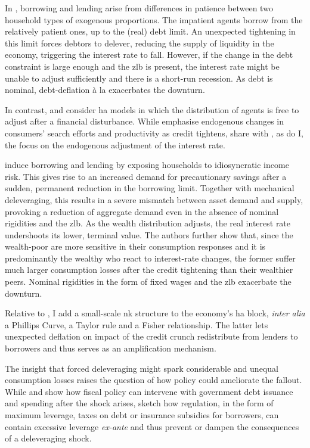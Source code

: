 \documentclass[a4paper,12pt]{article} %
\numberwithin{equation}{section} %
\numberwithin{figure}{section}
\numberwithin{table}{section}
\begin{document}
In \textcite{egg2012}, borrowing and lending arise from differences in patience between two household types of exogenous proportions. The impatient agents borrow from the relatively patient ones, up to the (real) debt limit. An unexpected tightening in this limit forces debtors to delever, reducing the supply of liquidity in the economy, triggering the interest rate to fall. However, if the change in the debt constraint is large enough and the \Gls{zlb} is present, the interest rate might be unable to adjust sufficiently and there is a short-run recession. As debt is nominal, debt-deflation à la \textcite{fisher1933} exacerbates the downturn.

In contrast, \textcite{riosrull2015} and \textcite{gl2017} consider \Gls{ha} models in which the distribution of agents is free to adjust after a financial disturbance. While \textcite{riosrull2015} emphasise endogenous changes in consumers' search efforts and productivity as credit tightens, \textcite{gl2017} share with \textcite{egg2012}, as do I, the focus on the endogenous adjustment of the interest rate.

\textcite{gl2017} induce borrowing and lending by exposing households to idiosyncratic income risk. This gives rise to an increased demand for precautionary savings after a sudden, permanent reduction in the borrowing limit. Together with mechanical deleveraging, this results in a severe mismatch between asset demand and supply, provoking a reduction of aggregate demand even in the absence of nominal rigidities and the \Gls{zlb}. As the wealth distribution adjusts, the real interest rate undershoots its lower, terminal value. The authors further show that, since the wealth-poor are more sensitive in their consumption responses and it is predominantly the wealthy who react to interest-rate changes, the former suffer much larger consumption losses after the credit tightening than their wealthier peers. Nominal rigidities in the form of fixed wages and the \Gls{zlb} exacerbate the downturn. 

Relative to \textcite{gl2017}, I add a small-scale \Gls{nk} structure to the economy's \Gls{ha} block, \textit{inter alia} a Phillips Curve, a Taylor rule and a Fisher relationship. The latter lets unexpected deflation on impact of the credit crunch redistribute from lenders to borrowers and thus serves as an amplification mechanism.

The insight that forced deleveraging might spark considerable and unequal consumption losses raises the question of how policy could ameliorate the fallout. While \textcite{egg2012} and \textcite{gl2017} show how fiscal policy can intervene with government debt issuance and spending after the shock arises, \textcite{korinek2016} sketch how regulation, in the form of maximum leverage, taxes on debt or insurance subsidies for borrowers, can contain excessive leverage \textit{ex-ante} and thus prevent or dampen the consequences of a deleveraging shock.
\end{document}
